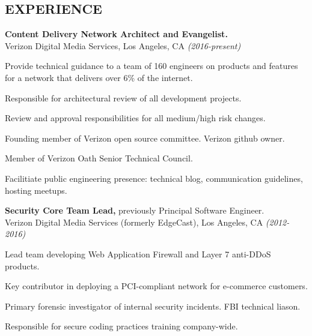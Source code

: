 \documentclass[margin]{res}
\begin{document}
\begin{resume}
\section{EXPERIENCE}
\noindent
{\bf Content Delivery Network Architect and Evangelist.}\\ 
Verizon Digital Media Services, Los Angeles, CA {\em (2016-present)}
\begin{list}{}{\leftmargin=1.5em \topsep=5pt \partopsep=0pt \parsep=2.5pt}
  \item Provide technical guidance to a team of 160 engineers on products and features for a network that delivers over 6\% of the internet. 
  \item Responsible for architectural review of all development projects.
  \item Review and approval responsibilities for all medium/high risk changes.
  \item Founding member of Verizon open source committee.  Verizon github owner.
  \item Member of Verizon Oath Senior Technical Council.
  \item Facilitiate public engineering presence: technical blog, communication guidelines, hosting meetups.
\end{list}

{\bf Security Core Team Lead,} previously Principal Software Engineer.\\ 
Verizon Digital Media Services (formerly EdgeCast), Los Angeles, CA {\em (2012-2016)}
\begin{list}{}{\leftmargin=1.5em \topsep=5pt \partopsep=0pt \parsep=2.5pt}
  \item Lead team developing Web Application Firewall and Layer 7
    anti-DDoS products.
  \item Key contributor in deploying a PCI-compliant network for e-commerce customers.
  \item Primary forensic investigator of internal security incidents.  
    FBI technical liason.
  \item Responsible for secure coding practices training company-wide.
\end{list}


\end{resume}
\end{document}
